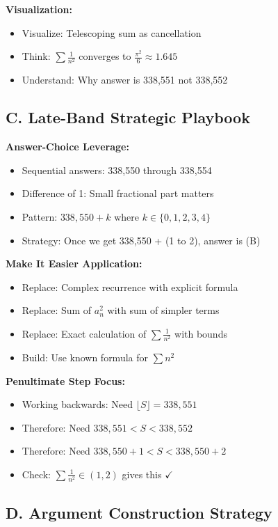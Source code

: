\documentclass[12pt]{article}
\begin{document}
\begin{strategicbox}
\textbf{Visualization:}
\begin{itemize}
    \item Visualize: Telescoping sum as cancellation
    \item Think: $\sum \frac{1}{n^2}$ converges to $\frac{\pi^2}{6} \approx 1.645$
    \item Understand: Why answer is 338,551 not 338,552
\end{itemize}

\subsection*{C. Late-Band Strategic Playbook}

\textbf{Answer-Choice Leverage:}
\begin{itemize}
    \item Sequential answers: 338,550 through 338,554
    \item Difference of 1: Small fractional part matters
    \item Pattern: $338,550 + k$ where $k \in \{0,1,2,3,4\}$
    \item Strategy: Once we get 338,550 + (1 to 2), answer is (B)
\end{itemize}

\textbf{Make It Easier Application:}
\begin{itemize}
    \item Replace: Complex recurrence with explicit formula
    \item Replace: Sum of $a_n^2$ with sum of simpler terms
    \item Replace: Exact calculation of $\sum \frac{1}{n^2}$ with bounds
    \item Build: Use known formula for $\sum n^2$
\end{itemize}

\textbf{Penultimate Step Focus:}
\begin{itemize}
    \item Working backwards: Need $\lfloor S \rfloor = 338,551$
    \item Therefore: Need $338,551 < S < 338,552$
    \item Therefore: Need $338,550 + 1 < S < 338,550 + 2$
    \item Check: $\sum \frac{1}{n^2} \in (1, 2)$ gives this $\checkmark$
\end{itemize}

\subsection*{D. Argument Construction Strategy}


\end{strategicbox}
\end{document}
